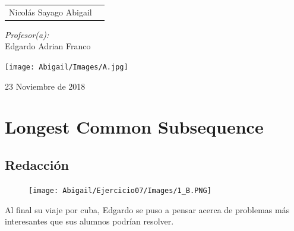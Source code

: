 \documentclass[12pt]{article}
\begin{document}
\begin{titlepage}
\begin{center}
\begin{minipage}{0.5\textwidth}
\begin{flushleft}
                        \begin{tabular}{ll}
                         Nicolás Sayago Abigail\\
                    \end{tabular}
                    \end{flushleft}
                \end{minipage}%
                \begin{minipage}{0.5\textwidth}
                    \begin{flushright} \large
                        \emph{Profesor(a):} \\
                        Edgardo Adrian Franco  \\
                    \end{flushright}
                \end{minipage}
                \vfill
                \begin{minipage}{0.5\textwidth}
                    \begin{center} \large
                        \texttt{[image: Abigail/Images/A.jpg]}
                    \end{center}
                \end{minipage}
                    
                {\large 23 Noviembre de 2018}
            \end{center}
        \end{titlepage}
    \tableofcontents
  \newpage


    \section{Longest Common Subsequence}
  
        \subsection{Redacción}
            \begin{figure}[h!]
    	        \centering
    	        \texttt{[image: Abigail/Ejercicio07/Images/1\_B.PNG]}
    	 	\end{figure} 

            Al final su viaje por cuba, Edgardo se puso a pensar acerca de problemas más interesantes que sus alumnos podrían resolver.
\end{document}
